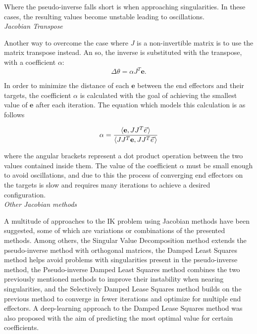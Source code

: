 Where the pseudo-inverse falls short is when approaching singularities. In these
cases, the resulting values become unstable leading to oscillations. \\

\noindent\textit{Jacobian Transpose}

Another way to overcome the case where \(J\) is a non-invertible matrix is to
use the matrix transpose instead. An so, the inverse is substituted with the
transpose, with a coefficient \(\alpha\):
\begin{equation}
    \Delta \theta = \alpha J^T \mathbf{e}.
\end{equation}

In order to minimize the distance of each \(\mathbf{e}\) between  the end effectors and
their targets, the coefficient \(\alpha\) is calculated with the goal of
achieving the smallest value of \(\mathbf{e}\) after each iteration. The equation
which models this calculation is as follows

\begin{equation}
    \alpha = \frac
        {
            \langle\mathbf{e}, J J^T \pvec{e}\rangle
        }
        {
            \langle J J^T \mathbf{e},J J^T \pvec{e} \rangle
        }
\end{equation}

\noindent where the angular brackets represent a dot product operation between the two
values contained inside them. The value of the coefficient \(\alpha\) must be
small enough to avoid oscillations, and due to this the process of converging
end effectors on the targets is slow and requires many iterations to achieve
a desired configuration. \\

\noindent\textit{Other Jacobian methods}

A multitude of approaches to the IK problem using Jacobian methods have been
suggested, some of which are variations or combinations of the presented
methods. Among others, the Singular Value Decomposition method \cite{num_recipes}
extends the pseudo-inverse method with orthogonal matrices, the Damped
Least Squares method \cite{Wampler1986ManipulatorIK} helps avoid problems with
singularities present in the pseudo-inverse method, the Pseudo-inverse Damped
Least Squares method \cite{maciejewski, num_recipes} combines the two previously
mentioned methods to improve their instability when nearing singularities, and
the Selectively Damped Lease Squares method \cite{buss_kim_sdls} builds on the
previous method to converge in fewer iterations and optimize for multiple end
effectors. A deep-learning approach to the Damped Lease Squares method was also
proposed \cite{wang_dldls} with the aim of predicting the most optimal value for
certain coefficients.

